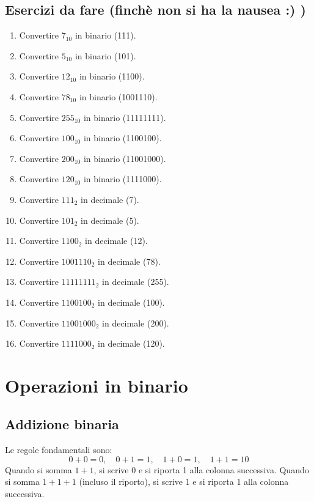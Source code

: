 \documentclass[12pt,a4paper]{article}
\begin{document}
\subsection{Esercizi da fare (finchè non si ha la nausea \texorpdfstring{:)}{(emoji felice)} )}
\begin{enumerate}
    \item Convertire $7_{10}$ in binario (111).
    \item Convertire $5_{10}$ in binario (101).
    \item Convertire $12_{10}$ in binario (1100).
    \item Convertire $78_{10}$ in binario (1001110).
    \item Convertire $255_{10}$ in binario (11111111).
    \item Convertire $100_{10}$ in binario (1100100).
    \item Convertire $200_{10}$ in binario (11001000).
    \item Convertire $120_{10}$ in binario (1111000).
    \item Convertire $111_2$ in decimale (7).
    \item Convertire $101_2$ in decimale (5).
    \item Convertire $1100_2$ in decimale (12).
    \item Convertire $1001110_2$ in decimale (78).
    \item Convertire $11111111_2$ in decimale (255).
    \item Convertire $1100100_2$ in decimale (100).
    \item Convertire $11001000_2$ in decimale (200).
    \item Convertire $1111000_2$ in decimale (120).
\end{enumerate}

\newpage
\section{Operazioni in binario}

\subsection{Addizione binaria}

Le regole fondamentali sono:
\[
0+0=0, \quad 0+1=1, \quad 1+0=1, \quad 1+1=10
\]
Quando si somma $1+1$, si scrive 0 e si riporta 1 alla colonna successiva.
Quando si somma $1+1+1$ (incluso il riporto), si scrive 1 e si riporta 1 alla colonna successiva.
\end{document}
